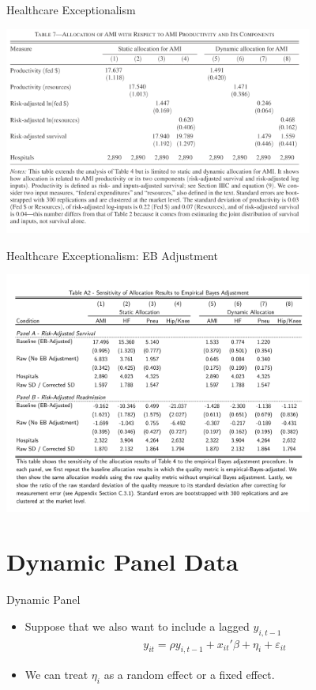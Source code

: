 \documentclass[aspectratio=169]{beamer}
\begin{document}
\begin{frame}{Healthcare Exceptionalism}
\begin{center}
\includegraphics[width=4in]{./resources/hc7.png}
\end{center}
\end{frame}

\begin{frame}{Healthcare Exceptionalism: EB Adjustment}
\begin{center}
\includegraphics[width=4in]{./resources/hc_a2.png}
\end{center}
\end{frame}




\section*{Dynamic Panel Data}

\begin{frame}{Dynamic Panel}
\begin{itemize}
\item Suppose that we also want to include a lagged $y_{i,t-1}$
\begin{eqnarray*}
y_{it} = \rho y_{i,t-1} + x_{it}'\beta + \eta_i + \varepsilon_{it}
\end{eqnarray*}
\item We can treat $\eta_i$ as a \alert{random effect} or a \alert{fixed effect}.
\end{itemize}
\end{frame}
\end{document}
